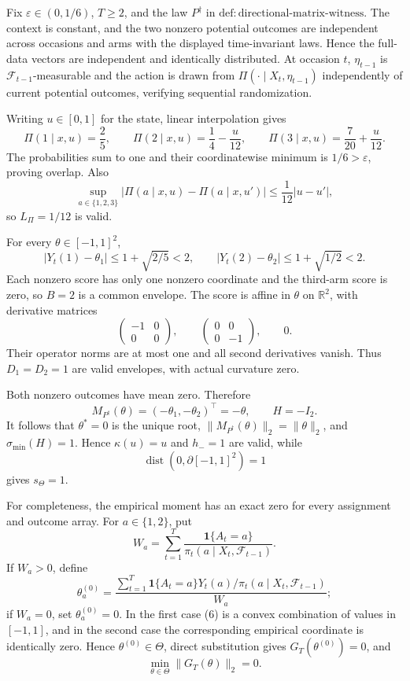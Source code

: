 Fix \(\varepsilon\in(0,1/6)\), \(T\ge2\), and the law \(P^{\dagger}\) in \(\mathrm{def:directional\text{-}matrix\text{-}witness}\). The context is constant, and the two nonzero potential outcomes are independent across occasions and arms with the displayed time-invariant laws. Hence the full-data vectors are independent and identically distributed. At occasion \(t\), \(\eta_{t-1}\) is \(\mathcal F_{t-1}\)-measurable and the action is drawn from \(\Pi(\cdot\mid X_t,\eta_{t-1})\) independently of current potential outcomes, verifying sequential randomization.

Writing \(u\in[0,1]\) for the state, linear interpolation gives
\[
 \Pi(1\mid x,u)=\frac25,\qquad
 \Pi(2\mid x,u)=\frac14-\frac{u}{12},\qquad
 \Pi(3\mid x,u)=\frac7{20}+\frac{u}{12}.
\tag{1}
\]
The probabilities sum to one and their coordinatewise minimum is \(1/6>\varepsilon\), proving overlap. Also
\[
 \sup_{a\in\{1,2,3\}}|\Pi(a\mid x,u)-\Pi(a\mid x,u')|
 \le\frac1{12}|u-u'|,
\tag{2}
\]
so \(L_\Pi=1/12\) is valid.

For every \(\theta\in[-1,1]^2\),
\[
 |Y_t(1)-\theta_1|\le1+\sqrt{2/5}<2,
 \qquad |Y_t(2)-\theta_2|\le1+\sqrt{1/2}<2.
\tag{3}
\]
Each nonzero score has only one nonzero coordinate and the third-arm score is zero, so \(B=2\) is a common envelope. The score is affine in \(\theta\) on \(\mathbb R^2\), with derivative matrices
\[
 \begin{pmatrix}-1&0\\0&0\end{pmatrix},\qquad
 \begin{pmatrix}0&0\\0&-1\end{pmatrix},\qquad 0.
\]
Their operator norms are at most one and all second derivatives vanish. Thus \(D_1=D_2=1\) are valid envelopes, with actual curvature zero.

Both nonzero outcomes have mean zero. Therefore
\[
 M_{P^{\dagger}}(\theta)=(-\theta_1,-\theta_2)^\top=-\theta,
 \qquad H=-I_2.
\tag{4}
\]
It follows that \(\theta^*=0\) is the unique root, \(\|M_{P^{\dagger}}(\theta)\|_2=\|\theta\|_2\), and \(\sigma_{\min}(H)=1\). Hence \(\kappa(u)=u\) and \(h_-=1\) are valid, while
\[
 \operatorname{dist}(0,\partial[-1,1]^2)=1
\tag{5}
\]
gives \(s_\Theta=1\).

For completeness, the empirical moment has an exact zero for every assignment and outcome array. For \(a\in\{1,2\}\), put
\[
 W_a=\sum_{t=1}^T\frac{\mathbf1\{A_t=a\}}
 {\pi_t(a\mid X_t,\mathcal F_{t-1})}.
\]
If \(W_a>0\), define
\[
 \theta_a^{(0)}=
 \frac{\sum_{t=1}^T\mathbf1\{A_t=a\}Y_t(a)/
 \pi_t(a\mid X_t,\mathcal F_{t-1})}{W_a};
\tag{6}
\]
if \(W_a=0\), set \(\theta_a^{(0)}=0\). In the first case (6) is a convex combination of values in \([-1,1]\), and in the second case the corresponding empirical coordinate is identically zero. Hence \(\theta^{(0)}\in\Theta\), direct substitution gives \(G_T(\theta^{(0)})=0\), and
\[
 \min_{\theta\in\Theta}\|G_T(\theta)\|_2=0.
\tag{7}
\]

